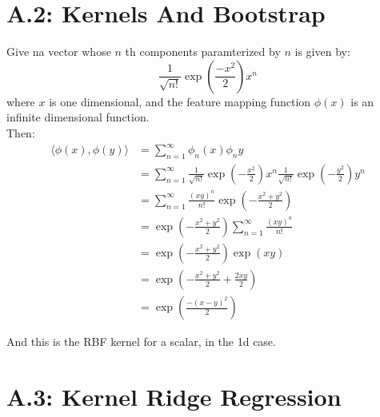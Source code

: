 \documentclass[]{article}
\begin{document}
\section*{A.2: Kernels And Bootstrap}
    Give na vector whose $n$ th components paramterized by $n$ is given by: 
    $$
        \frac{1}{\sqrt{n!}}\exp \left(
            \frac{-x^2}{2}
        \right)x^n
    $$
    where $x$ is one dimensional, and the feature mapping function $\phi(x)$ is an infinite dimensional function. 
    \\
    Then: 
    \begin{align*}\tag{A.2.1}\label{eqn:A.2.1}
        \langle \phi(x), \phi(y)\rangle &= 
        \sum_{n = 1}^{\infty}
            \phi_n(x)\phi_n{y}
        \\
        &= 
        \sum_{n = 1}^{\infty}
            \frac{1}{\sqrt{n!}} 
            \exp \left(
                -\frac{x^2}{2}
            \right)x^n
            \frac{1}{\sqrt{n!}} 
            \exp \left(
                -\frac{y^2}{2}
            \right)y^n
        \\
        &= 
        \sum_{n = 1}^{\infty}
            \frac{(xy)^n}{n!}\exp\left(
                -\frac{x^2 + y^2}{2}
            \right)
        \\
        &= 
        \exp\left(
                -\frac{x^2 + y^2}{2}
            \right)
        \sum_{n = 1}^{\infty}
        \frac{(xy)^n}{n!}
        \\
        &= 
        \exp\left(
            - \frac{x^ 2 + y^ 2}{2}
        \right)
        \exp\left(
            xy
        \right)
        \\
        &= 
        \exp\left(
            - \frac{x^ 2 + y^ 2}{2} + \frac{2xy}{2} 
        \right)
        \\
        &= 
        \exp\left(
            \frac{-(x - y)^2}{2}
        \right)
    \end{align*}

    And this is the RBF kernel for a scalar, in the 1d case. 
    
\section*{A.3: Kernel Ridge Regression}
\end{document}
